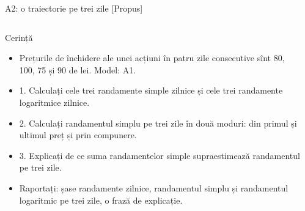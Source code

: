 \begin{frame}{A2: o traiectorie pe trei zile [Propus]}
\propsub
\itemsize{\footnotesize}
\begin{columns}[T]
\begin{column}{\taskw}
\begin{block}{Cerință}
\begin{itemize}
    \item Prețurile de închidere ale unei acțiuni în patru zile consecutive sînt 80, 100, 75 și 90 de lei. Model: A1.
    \item 1. Calculați cele trei randamente simple zilnice și cele trei randamente logaritmice zilnice.
    \item 2. Calculați randamentul simplu pe trei zile în două moduri: din primul și ultimul preț și prin compunere.
    \item 3. Explicați de ce suma randamentelor simple supraestimează randamentul pe trei zile.
    \item Raportați: șase randamente zilnice, randamentul simplu și randamentul logaritmic pe trei zile, o frază de explicație.
\end{itemize}
\end{block}
\end{column}
\begin{column}{\solw}
\end{column}
\end{columns}
\end{frame}

